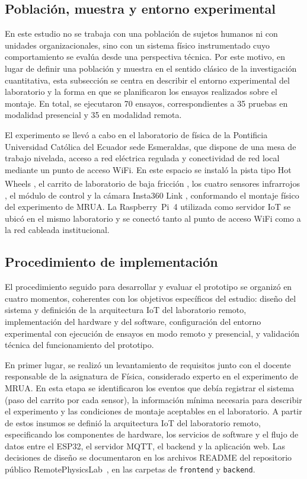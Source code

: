 \documentclass[journal,article,submit,pdftex]{Definitions/mdpi}
\begin{document}
\subsection{Poblaci\'on, muestra y entorno experimental}

En este estudio no se trabaja con una poblaci\'on de sujetos humanos ni con unidades organizacionales, sino con un sistema f\'isico instrumentado cuyo comportamiento se eval\'ua desde una perspectiva t\'ecnica. Por este motivo, en lugar de definir una poblaci\'on y muestra en el sentido cl\'asico de la investigaci\'on cuantitativa, esta subsecci\'on se centra en describir el entorno experimental del laboratorio y la forma en que se planificaron los ensayos realizados sobre el montaje. En total, se ejecutaron 70 ensayos, correspondientes a 35 pruebas en modalidad presencial y 35 en modalidad remota.

El experimento se llev\'o a cabo en el laboratorio de f\'isica de la Pontificia Universidad Cat\'olica del Ecuador sede Esmeraldas, que dispone de una mesa de trabajo nivelada, acceso a red el\'ectrica regulada y conectividad de red local mediante un punto de acceso WiFi. En este espacio se instal\'o la pista tipo Hot Wheels\textsuperscript{\textregistered} \cite{r18}, el carrito de laboratorio de baja fricci\'on \cite{r19}, los cuatro sensores infrarrojos \cite{r20}, el m\'odulo de control \cite{r21,r53} y la c\'amara Insta360 Link \cite{r36}, conformando el montaje f\'isico del experimento de MRUA. La Raspberry~Pi~4 utilizada como servidor IoT \cite{r37} se ubic\'o en el mismo laboratorio y se conect\'o tanto al punto de acceso WiFi \cite{r32} como a la red cableada institucional.

\subsection{Procedimiento de implementaci\'on}

El procedimiento seguido para desarrollar y evaluar el prototipo se organiz\'o en cuatro momentos, coherentes con los objetivos espec\'ificos del estudio: dise\~no del sistema y definici\'on de la arquitectura IoT del laboratorio remoto, implementaci\'on del hardware y del software, configuraci\'on del entorno experimental con ejecuci\'on de ensayos en modo remoto y presencial, y validaci\'on t\'ecnica del funcionamiento del prototipo.

En primer lugar, se realiz\'o un levantamiento de requisitos junto con el docente respon\-sable de la asignatura de F\'isica, considerado experto en el experimento de MRUA. En esta etapa se identificaron los eventos que deb\'ia registrar el sistema (paso del carrito por cada sensor), la informaci\'on m\'inima necesaria para describir el experimento y las condiciones de montaje aceptables en el laboratorio. A partir de estos insumos se defini\'o la arquitectura IoT del laboratorio remoto, especificando los componentes de hardware, los servicios de software y el flujo de datos entre el ESP32, el servidor MQTT, el backend y la aplicaci\'on web. Las decisiones de dise\~no se documentaron en los archivos README del repositorio p\'ublico RemotePhysicsLab~\cite{r15}, en las carpetas de \texttt{frontend} y \texttt{backend}.
\end{document}
